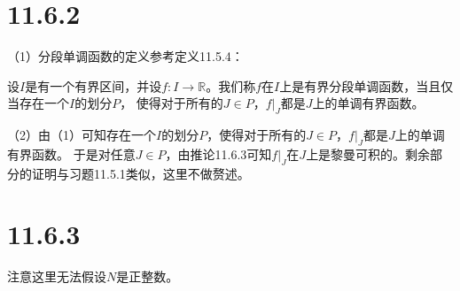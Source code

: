 \documentclass{article}
\begin{document}
\section*{11.6.2}
（1）分段单调函数的定义参考定义11.5.4：

设$I$是有一个有界区间，并设$f: I \to \mathbb{R}$。我们称$f$在$I$上是有界分段单调函数，当且仅当存在一个$I$的划分$P$，
使得对于所有的$J \in P$，$f|_J$都是$J$上的单调有界函数。

（2）由（1）可知存在一个$I$的划分$P$，使得对于所有的$J \in P$，$f|_J$都是$J$上的单调有界函数。
于是对任意$J \in P$，由推论11.6.3可知$f|_J$在$J$上是黎曼可积的。剩余部分的证明与习题11.5.1类似，这里不做赘述。

\section*{11.6.3}

注意这里无法假设$N$是正整数。
\end{document}

